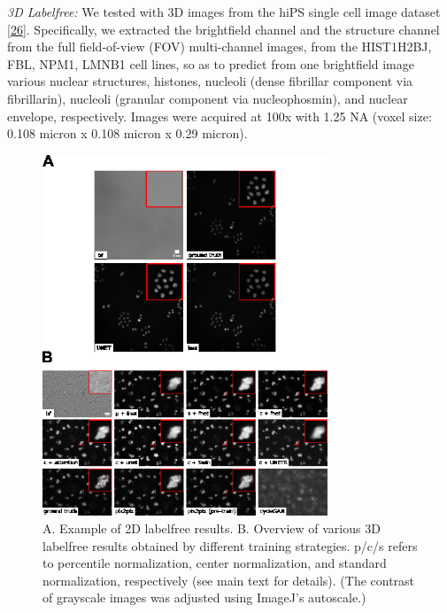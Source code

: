 \emph{3D Labelfree:} We tested with 3D images from the hiPS single cell image dataset {[}\protect\hyperlink{ref-5sGcmDuy}{26}{]}. Specifically, we extracted the brightfield channel and the structure channel from the full field-of-view (FOV) multi-channel images, from the HIST1H2BJ, FBL, NPM1, LMNB1 cell lines, so as to predict from one brightfield image various nuclear structures, histones, nucleoli (dense fibrillar component via fibrillarin), nucleoli (granular component via nucleophosmin), and nuclear envelope, respectively. Images were acquired at 100x with 1.25 NA (voxel size: 0.108 micron x 0.108 micron x 0.29 micron).

\begin{figure}
\hypertarget{fig:labelfree_comparison}{%
\centering
\includegraphics[width=0.76\textwidth,height=0.9\textheight]{images/labelfree_comparison_justin.png}
\caption{A. Example of 2D labelfree results. B. Overview of various 3D labelfree results obtained by different training strategies. p/c/s refers to percentile normalization, center normalization, and standard normalization, respectively (see main text for details). (The contrast of grayscale images was adjusted using ImageJ's autoscale.)}\label{fig:labelfree_comparison}
}
\end{figure}

